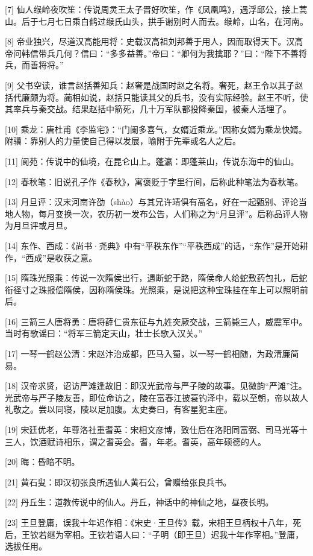 \documentclass[12pt,UTF8]{ctexbook}
\begin{document}
[7] 仙人缑岭夜吹笙：传说周灵王太子晋好吹笙，作《凤凰鸣》，遇浮邱公，接上蒿山。后于七月七日乘白鹤过缑氏山头，拱手谢别时人而去。缑岭，山名，在河南。

[8] 帝业独兴，尽道汉高能用将：史载汉高祖刘邦善于用人，因而取得天下。汉高帝问韩信带兵几何？信曰：“多多益善。”帝曰：“卿何为我擒耶？”曰：“陛下不善将兵，而善将将。”

[9] 父书空读，谁言赵括善知兵：赵奢是战国时赵之名将。奢死，赵王令以其子赵括代廉颇为将。蔺相如说，赵括只能读其父的兵书，没有实际经验。赵王不听，使其率兵与秦交战。结果赵括中箭死，几十万军队都投降秦国，被秦人活埋了。

[10] 乘龙：唐杜甫《李监宅》：“门阑多喜气，女婿近乘龙。”因称女婿为乘龙快婿。附骥：靠别人的力量使自己得以发展，喻附于先辈或名人之后。

[11] 阆苑：传说中的仙境，在昆仑山上。蓬瀛：即蓬莱山，传说东海中的仙山。

[12] 春秋笔：旧说孔子作《春秋》，寓褒贬于字里行间，后称此种笔法为春秋笔。

[13] 月旦评：汉末河南许劭（shào）与其兄许靖俱有高名，好在一起甄别、评论当地人物，每月变换一次，农历初一发布公告，人们称之为“月旦评”。后称品评人物为月旦评或月旦。

[14] 东作、西成：《尚书·尧典》中有“平秩东作”“平秩西成”的话，“东作”是开始耕作，“西成”是收获之意。

[15] 隋珠光照乘：传说一次隋侯出行，遇断蛇于路，隋侯命人给蛇敷药包扎，后蛇衔径寸之珠报偿隋侯，因称隋侯珠。光照乘，是说把这种宝珠挂在车上可以照明前后。

[16] 三箭三人唐将勇：唐将薛仁贵东征与九姓突厥交战，三箭毙三人，威震军中。当时有歌谣曰：“将军三箭定天山，壮士长歌入汉关。”

[17] 一琴一鹤赵公清：宋赵汴治成都，匹马入蜀，以一琴一鹤相随，为政清廉简易。

[18] 汉帝求贤，诏访严滩逢故旧：即汉光武帝与严子陵的故事。见微韵“严滩”注。光武帝与严子陵友善，即位命访之，陵在富春江披蓑钓泽中，载以至朝，帝以故人礼敬之。尝以同寝，陵以足加腹。太史奏曰，有客星犯主座。

[19] 宋廷优老，年尊洛社重耆英：宋相文彦博，致仕后在洛阳同富弼、司马光等十三人，饮酒赋诗相乐，谓之耆英会。耆，年老。耆英，高年硕德的人。

[20] 晦：昏暗不明。

[21] 黄石叟：即汉初张良所遇仙人黄石公，曾赠给张良兵书。

[22] 丹丘生：道教传说中的仙人。丹丘，神话中的神仙之地，昼夜长明。

[23] 王旦登庸，误我十年迟作相：《宋史·王旦传》载，宋相王旦柄权十八年，死后，王钦若继为宰相。王钦若语人曰：“子明（即王旦）迟我十年作宰相。”登庸，选拔任用。
\end{document}
